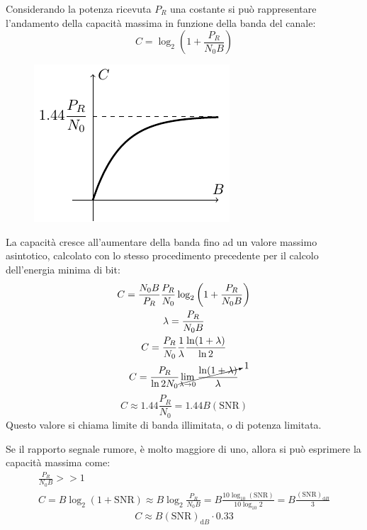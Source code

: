 \documentclass{article}
\newcommand{\df}{\mathrm{d}}
\numberwithin{equation}{subsection}
\begin{document}
Considerando la potenza ricevuta $P_R$ una costante si può rappresentare l'andamento della capacità massima in funzione della banda del canale:
\begin{equation*}
    C=\log_2\left(\displaystyle1+\frac{P_R}{N_0B}\right)
\end{equation*}
\begin{figure}[H]%
    \centering
    \includegraphics{shannon-2.pdf}%
\end{figure}
La capacità cresce all'aumentare della banda fino ad un valore massimo asintotico, calcolato con lo stesso procedimento precedente per il calcolo dell'energia minima di bit:
\begin{gather*}
    \displaystyle C=\frac{N_0B}{P_R}\frac{P_R}{N_0}\log_2\left(1+\frac{P_R}{N_0B}\right)\\
    \lambda=\displaystyle\frac{P_R}{N_0B}\\
    \displaystyle C=\frac{P_R}{N_0}\frac{1}{\lambda}\frac{\ln(1+\lambda)}{\ln2}\\
    C=\displaystyle\frac{P_R}{\ln2 N_0}\cancelto{1}{\lim_{\lambda\to0}\frac{\ln(1+\lambda)}{\lambda}}
\end{gather*}
\begin{equation}
    C\approx\displaystyle1.44\frac{P_R}{N_0}=1.44 B(\mathrm{SNR})
\end{equation}
Questo valore si chiama limite di banda illimitata, o di potenza limitata. 

Se il rapporto segnale rumore, è molto maggiore di uno, allora si può esprimere la capacità massima come:
\begin{gather*}
    \displaystyle\frac{P_R}{N_0B}>>1\\
    C=B\log_2(1+\mathrm{SNR})\approx B\log_2\displaystyle\frac{P_R}{N_0B}=B\displaystyle\frac{10\log_{10}(\mathrm{SNR})}{10\log_{10}2}= B\frac{(\mathrm{SNR})_{\df B}}{3}
\end{gather*}
\begin{equation}
    C\approx B(\mathrm{SNR})_{\df B}\cdot0.33
\end{equation}
\end{document}
